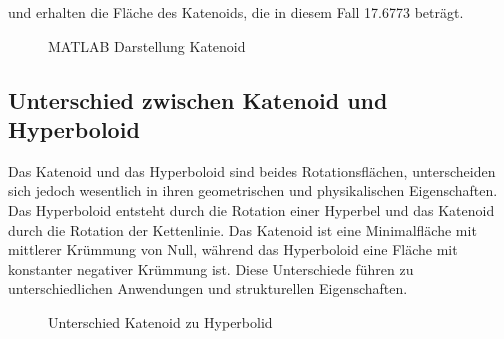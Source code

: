 und erhalten die Fläche des Katenoids, die in diesem Fall 17.6773 beträgt.


\begin{figure}
	\centering
	\caption{MATLAB Darstellung Katenoid}
	\label{fig:katenoid}
\end{figure}

\subsection{Unterschied zwischen Katenoid und Hyperboloid
	\label{Das Katenoid:subsection:Unterschied zwischen Katenoid und Hyperboloid}}
Das Katenoid und das Hyperboloid sind beides Rotationsflächen, unterscheiden sich jedoch wesentlich in ihren geometrischen und physikalischen Eigenschaften.
Das Hyperboloid entsteht durch die Rotation einer Hyperbel und das Katenoid durch die Rotation der Kettenlinie. 
Das Katenoid ist eine Minimalfläche mit mittlerer Krümmung von Null, während das Hyperboloid eine Fläche mit konstanter negativer Krümmung ist.
Diese Unterschiede führen zu unterschiedlichen Anwendungen und strukturellen Eigenschaften.
\begin{figure}
	\centering
	\caption{Unterschied Katenoid zu Hyperbolid}
	\label{fig:bild1}
\end{figure}

